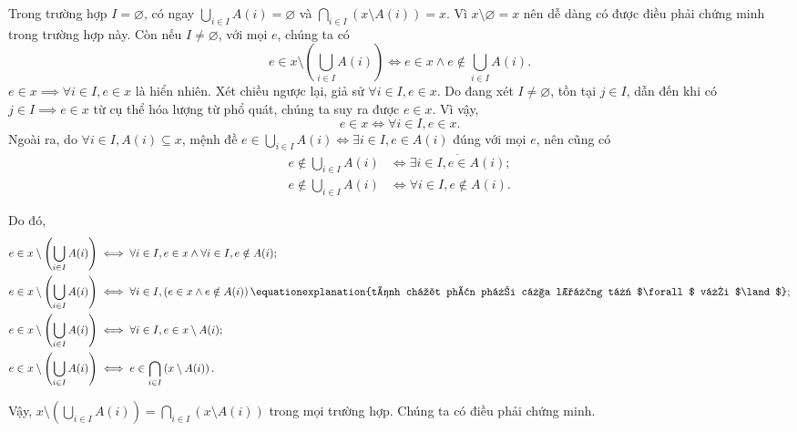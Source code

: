 Trong trường hợp $I = \varnothing$, có ngay $\bigcup_{i \in I}A(i) = \varnothing$ và $\bigcap_{i \in I}(x \setminus A(i)) = x$. Vì $x \setminus \varnothing = x$ nên dễ dàng có được điều phải chứng minh trong trường hợp này. Còn nếu $I \neq \varnothing$, với mọi $e$, chúng ta có 
\begin{equation*}
   e \in x \setminus \left(\bigcup_{i \in I}A(i)\right) \iff e \in x \land e \notin \bigcup_{i \in I}A(i).
\end{equation*}
$e \in x \implies \forall i \in I, e \in x$ là hiển nhiên. Xét chiều ngược lại, giả sử $\forall i \in I, e \in x$. Do đang xét $I \neq \varnothing$, tồn tại $j \in I$, dẫn đến khi có $j \in I \implies e \in x$ từ cụ thể hóa lượng từ phổ quát, chúng ta suy ra được $e \in x$. Vì vậy, \begin{equation*}
   e \in x \iff \forall i \in I, e \in x.
\end{equation*} 
Ngoài ra, do $\forall i \in I, A(i) \subseteq x$, mệnh đề $e \in \bigcup_{i \in I}A(i) \iff \exists i \in I, e \in A(i)$ đúng với mọi $e$, nên cũng có 
\begin{align*}
   e \notin \bigcup_{i \in I}A(i) &\iff \overline{\exists i \in I, e \in A(i)}; \\
   e \notin \bigcup_{i \in I}A(i) &\iff \forall i \in I, e \notin A(i).
\end{align*}

Do đó, \begin{align*}
   e \in x \setminus \left(\bigcup_{i \in I}A(i)\right) &\iff \forall i \in I, e \in x \land \forall i \in I, e \notin A(i); \\
   e \in x \setminus \left(\bigcup_{i \in I}A(i)\right) &\iff \forall i \in I, \left(e \in x \land e \notin A(i)\right) \equationexplanation{tính chất phân phối của lượng từ $\forall$ với $\land$}; \\
   e \in x \setminus \left(\bigcup_{i \in I}A(i)\right) &\iff \forall i \in I, e \in x \setminus A(i); \\
   e \in x \setminus \left(\bigcup_{i \in I}A(i)\right) &\iff e \in \bigcap_{i \in I} \left(x \setminus A(i)\right).
\end{align*}

Vậy, $x \setminus \left(\bigcup_{i \in I}A(i)\right) = \bigcap_{i \in I} \left(x \setminus A(i)\right)$ trong mọi trường hợp. Chúng ta có điều phải chứng minh.

